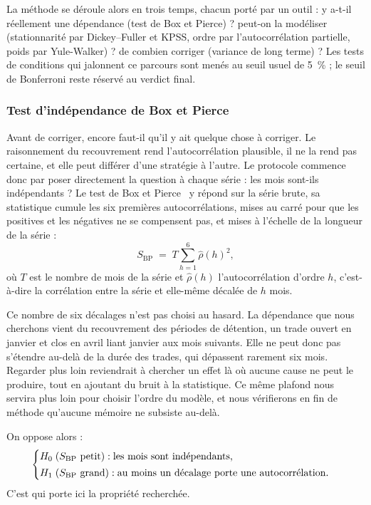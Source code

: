La méthode se déroule alors en trois temps, chacun porté par un outil :
y a-t-il réellement une dépendance (test de Box et Pierce) ? peut-on la
modéliser (stationnarité par Dickey--Fuller et KPSS, ordre par
l'autocorrélation partielle, poids par Yule-Walker) ? de combien corriger
(variance de long terme) ? Les tests de conditions qui jalonnent ce parcours
sont menés au seuil usuel de 5~\% ; le seuil de Bonferroni reste réservé au
verdict final.

\subsubsection*{Test d'indépendance de Box et Pierce}

Avant de corriger, encore faut-il qu'il y ait quelque chose à corriger. Le
raisonnement du recouvrement rend l'autocorrélation plausible, il ne la rend
pas certaine, et elle peut différer d'une stratégie à l'autre. Le protocole
commence donc par poser directement la question à chaque série : les mois
sont-ils indépendants ? Le test de Box et Pierce~\cite{boxpierce1970} y répond sur la série brute,
sa statistique cumule les six premières autocorrélations, mises au carré pour
que les positives et les négatives ne se compensent pas, et mises à l'échelle
de la longueur de la série :
\[
  S_{\mathrm{BP}} \;=\; T \sum_{h=1}^{6} \hat\rho(h)^2 ,
\]
où \(T\) est le nombre de mois de la série et \(\hat\rho(h)\)
l'autocorrélation d'ordre \(h\), c'est-à-dire la corrélation entre la série
et elle-même décalée de \(h\) mois.

Ce nombre de six décalages n'est pas choisi au hasard. La dépendance que nous
cherchons vient du recouvrement des périodes de détention, un trade ouvert en
janvier et clos en avril liant janvier aux mois suivants. Elle ne peut donc
pas s'étendre au-delà de la durée des trades, qui dépassent rarement six mois.
Regarder plus loin reviendrait à chercher un effet là où aucune cause ne peut
le produire, tout en ajoutant du bruit à la statistique. Ce même plafond nous
servira plus loin pour choisir l'ordre du modèle, et nous vérifierons en fin
de méthode qu'aucune mémoire ne subsiste au-delà.

On oppose alors :
\[
  \begin{cases}
    H_0 \;(S_{\mathrm{BP}} \text{ petit}) : \text{les mois sont indépendants,}\\[2pt]
    H_1 \;(S_{\mathrm{BP}} \text{ grand}) : \text{au moins un décalage porte une autocorrélation.}
  \end{cases}
\]
C'est \Hzero{} qui porte ici la propriété recherchée.

